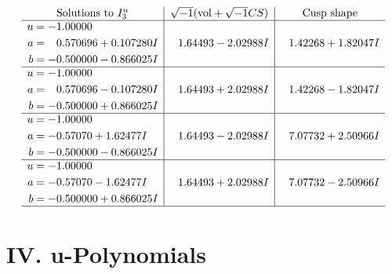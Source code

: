 \documentclass[1p]{elsarticle_modified}
\theoremstyle{definition}
\newcommand{\I}{\sqrt{-1}}
\begin{document}
$$\begin{array}{c|c|c}  
\text{Solutions to }I^u_{3}& \I (\text{vol} + \sqrt{-1}CS) & \text{Cusp shape}\\
 \hline 
\begin{aligned}
u &= -1.00000\phantom{ +0.000000I} \\
a &= \phantom{-}0.570696 + 0.107280 I \\
b &= -0.500000 - 0.866025 I\end{aligned}
 & \phantom{-}1.64493 - 2.02988 I & \phantom{-}1.42268 + 1.82047 I \\ \hline\begin{aligned}
u &= -1.00000\phantom{ +0.000000I} \\
a &= \phantom{-}0.570696 - 0.107280 I \\
b &= -0.500000 + 0.866025 I\end{aligned}
 & \phantom{-}1.64493 + 2.02988 I & \phantom{-}1.42268 - 1.82047 I \\ \hline\begin{aligned}
u &= -1.00000\phantom{ +0.000000I} \\
a &= -0.57070 + 1.62477 I \\
b &= -0.500000 - 0.866025 I\end{aligned}
 & \phantom{-}1.64493 - 2.02988 I & \phantom{-}7.07732 + 2.50966 I \\ \hline\begin{aligned}
u &= -1.00000\phantom{ +0.000000I} \\
a &= -0.57070 - 1.62477 I \\
b &= -0.500000 + 0.866025 I\end{aligned}
 & \phantom{-}1.64493 + 2.02988 I & \phantom{-}7.07732 - 2.50966 I\\
 \hline 
 \end{array}$$\newpage
\newpage\renewcommand{\arraystretch}{1}
\centering \section*{ IV. u-Polynomials}
\end{document}
